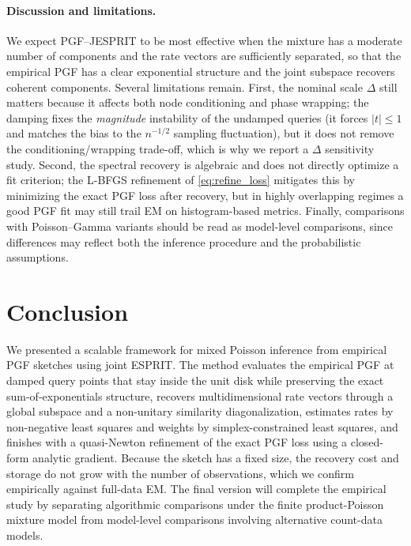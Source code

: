 \documentclass[sigconf,natbib=true,anonymous=true,review=true]{acmart}
\begin{document}
\paragraph{Discussion and limitations.}
We expect PGF--JESPRIT to be most effective when the mixture has a moderate number of
components and the rate vectors are sufficiently separated, so that the empirical PGF
has a clear exponential structure and the joint subspace recovers coherent components.
Several limitations remain. First, the nominal scale $\Delta$ still matters because it
affects both node conditioning and phase wrapping; the damping fixes the
\emph{magnitude} instability of the undamped queries (it forces $|t|\le1$ and matches
the bias to the $n^{-1/2}$ sampling fluctuation), but it does not remove the
conditioning/wrapping trade-off, which is why we report a $\Delta$ sensitivity study.
Second, the spectral recovery is algebraic and does not directly optimize a fit
criterion; the L-BFGS refinement of \eqref{eq:refine_loss} mitigates this by minimizing
the exact PGF loss after recovery, but in highly overlapping regimes a good PGF fit may
still trail EM on histogram-based metrics. Finally, comparisons with Poisson--Gamma
variants should be read as model-level comparisons, since differences may reflect both
the inference procedure and the probabilistic assumptions.

\section{Conclusion}

We presented a scalable framework for mixed Poisson inference from empirical PGF
sketches using joint ESPRIT. The method evaluates the empirical PGF at damped query
points that stay inside the unit disk while preserving the exact sum-of-exponentials
structure, recovers multidimensional rate vectors through a global subspace and a
non-unitary similarity diagonalization, estimates rates by non-negative least squares
and weights by simplex-constrained least squares, and finishes with a quasi-Newton
refinement of the exact PGF loss using a closed-form analytic gradient. Because the
sketch has a fixed size, the recovery cost and storage do not grow with the number of
observations, which we confirm empirically against full-data EM.
The final version will complete the empirical study by separating algorithmic
comparisons under the finite product-Poisson mixture model from model-level
comparisons involving alternative count-data models.

\end{document}
